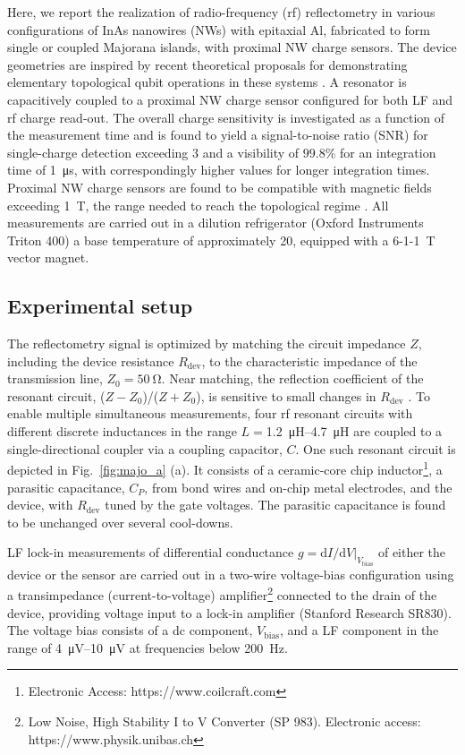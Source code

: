 Here, we report the realization of radio-frequency (rf) reflectometry in various configurations of InAs nanowires (NWs) with epitaxial Al, fabricated to form single or coupled Majorana islands, with proximal NW charge sensors. The device geometries are inspired by recent theoretical proposals for demonstrating elementary topological qubit operations in these systems \cite{AasenPRX16, PhysRevB.94.235446, Plugge, PhysRevB.95.235305}. A resonator is capacitively coupled to a proximal NW charge sensor configured for both LF and rf charge read-out. The overall charge sensitivity is investigated as a function of the measurement time and is found to yield a signal-to-noise ratio (SNR) for single-charge detection exceeding 3 and a visibility of $99.8\%$ for an integration time of \SI{1}{\micro\second}, with correspondingly higher values for longer integration times. Proximal NW charge sensors are found to be compatible with magnetic fields exceeding \SI{1}{\tesla}, the range needed to reach the topological regime \cite{Mourik1003,MT1,nature26142,AlbretchNature}. All measurements are carried out in a dilution refrigerator (Oxford Instruments Triton 400) a base temperature of approximately \SI{20}{\mk}, equipped with a 6-1-1~\si{\tesla} vector magnet.

\subsection{Experimental setup}

The reflectometry signal is optimized by matching the circuit impedance $Z$, including the device resistance $R_\textrm{dev}$, to the characteristic impedance of the transmission line, $Z_0 = \SI{50}{\ohm}$. Near matching, the reflection coefficient of the resonant circuit, ($Z-Z_{0}$)/($Z+Z_{0}$), is sensitive to small changes in $R_\textrm{dev}$ \cite{Reilly:2007ig,PhysRevApplied.5.034011}. To enable multiple simultaneous measurements, four rf resonant circuits with different discrete inductances in the range $L = $\SIrange{1.2}{4.7}{\micro\henry} are coupled to a single-directional coupler via a coupling capacitor, $C$. One such resonant circuit is depicted in Fig.~\ref{fig:majo_a} (a). It consists of a ceramic-core chip inductor\footnote{Electronic Access: https://www.coilcraft.com},  a parasitic capacitance, $C_P$, from bond wires and on-chip metal electrodes, and the device, with $R_\textrm{dev}$ tuned by the gate voltages. The parasitic capacitance is found to be unchanged over several cool-downs.

LF lock-in measurements of differential conductance $g = \textrm{d}I/\textrm{d}V|_{V_\textrm{bias}}$ of either the device or the sensor are carried out in a two-wire voltage-bias configuration using a transimpedance (current-to-voltage) amplifier\footnote{Low Noise, High Stability I to V Converter (SP 983). Electronic access: https://www.physik.unibas.ch} connected to the drain of the device, providing voltage input to a lock-in amplifier (Stanford Research SR830). The voltage bias consists of a dc component, $V_\textrm{bias}$, and a LF component in the range of \SIrange{4}{10}{\micro\volt} at frequencies below \SI{200}{\hertz}.

